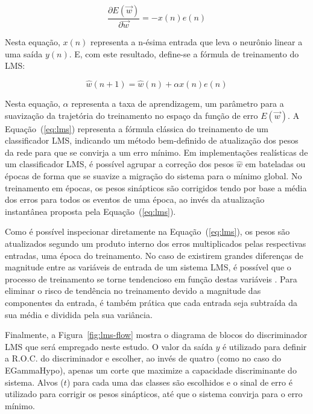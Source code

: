 \begin{equation}
\frac{\partial E(\overrightarrow{w})}{\partial \overrightarrow{w}} =
-x(n)e(n) 
\end{equation}

Nesta equação, $x(n)$ representa a n-ésima entrada que leva o neurônio linear
a uma saída $y(n)$. E, com este resultado, define-se a fórmula de treinamento
do LMS:

\begin{equation}
\hat{w}(n+1) = \hat{w}(n) + \alpha x(n)e(n)
\label{eq:lms}
\end{equation}

Nesta equação, $\alpha$ representa a taxa de aprendizagem, um parâmetro para a
suavização da trajetória do treinamento no espaço da função de erro
$E(\overrightarrow{w})$. A Equação~(\ref{eq:lms}) representa a fórmula
clássica do treinamento de um classificador LMS, indicando um método
bem-definido de atualização dos pesos da rede para que se convirja a um erro
mínimo. Em implementações realísticas de um classificador LMS, é possível
agrupar a correção dos pesos $\hat{w}$ em bateladas ou épocas de forma que se
suavize a migração do sistema para o mínimo global. No treinamento em épocas,
os pesos sinápticos são corrigidos tendo por base a média dos erros para todos
os eventos de uma época, ao invés da atualização instantânea proposta pela
Equação~(\ref{eq:lms}).

Como é possível inspecionar diretamente na Equação~(\ref{eq:lms}), os pesos
são atualizados segundo um produto interno dos erros multiplicados pelas
respectivas entradas, uma época do treinamento. No caso de existirem grandes
diferenças de magnitude entre as variáveis de entrada de um sistema LMS, é
possível que o processo de treinamento se torne tendencioso em função destas
variáveis \cite{haykin-adaptative}. Para eliminar o risco de tendência no
treinamento devido a magnitude das componentes da entrada, é também prática
que cada entrada seja subtraída da sua média e dividida pela sua variância.

Finalmente, a Figura~\ref{fig:lms-flow} mostra o diagrama de blocos do
discriminador LMS que será empregado neste estudo. O valor da saída $y$ é
utilizado para definir a R.O.C. do discriminador e escolher, ao invés de
quatro (como no caso do EGammaHypo), apenas um corte que maximize a capacidade
discriminante do sistema. Alvos ($t$) para cada uma das classes são escolhidos
e o sinal de erro é utilizado para corrigir os pesos sinápticos, até que o
sistema convirja para o erro mínimo.


